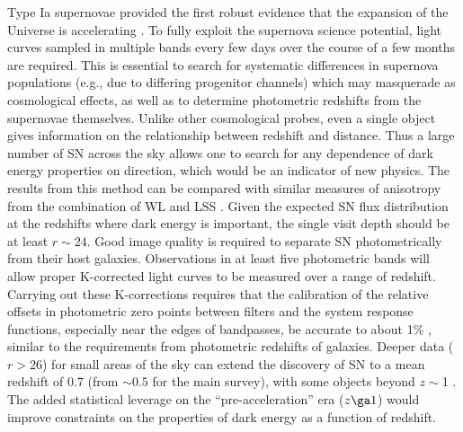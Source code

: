 Type Ia supernovae provided the first robust evidence that the expansion of the
Universe is accelerating \citep{1998AJ....116.1009R,1999ApJ...517..565P}. To fully
exploit the supernova science potential, light curves sampled in multiple
bands every few days over the course of a few months are required. This is
essential to search for systematic differences in supernova populations
(e.g., due to differing progenitor channels) which
may masquerade as cosmological effects, as well as to determine photometric
redshifts from the supernovae themselves. Unlike other cosmological probes,
even a single object gives information on the relationship between
redshift and distance.  Thus a large
number of SN across the sky allows one to search for any dependence
of dark energy properties on direction, which
would be an indicator of new physics. The results from this method can be compared
with similar measures of anisotropy from the combination of WL and LSS
\citep{2009ApJ...690..923Z}.
Given the expected SN flux distribution
at the redshifts where dark energy is important, the
single visit depth should be at least $r\sim24$. Good image quality is
required to separate SN photometrically from
their host galaxies. Observations in at least five photometric bands will allow
proper K-corrected light curves to be measured over a range of
redshift.  Carrying out these K-corrections requires that the
calibration of the relative offsets in photometric zero points between filters and
the system response functions, especially near the edges of
bandpasses, be accurate to about 1\% \citep{2007ApJ...666..694W},
similar to the requirements from photometric redshifts of galaxies. Deeper data
($r>26$) for small areas of the sky can extend the discovery of SN to a mean
redshift of 0.7 (from $\sim0.5$ for the main survey), with some objects beyond $z\sim$1
\citep[][SciBook Ch.~11]{2004AAS...20510818G,2004AAS...20510820P}. The added statistical leverage
on the ``pre-acceleration'' era ($z\ga1$) would improve constraints on the properties of
dark energy as a function of redshift.

